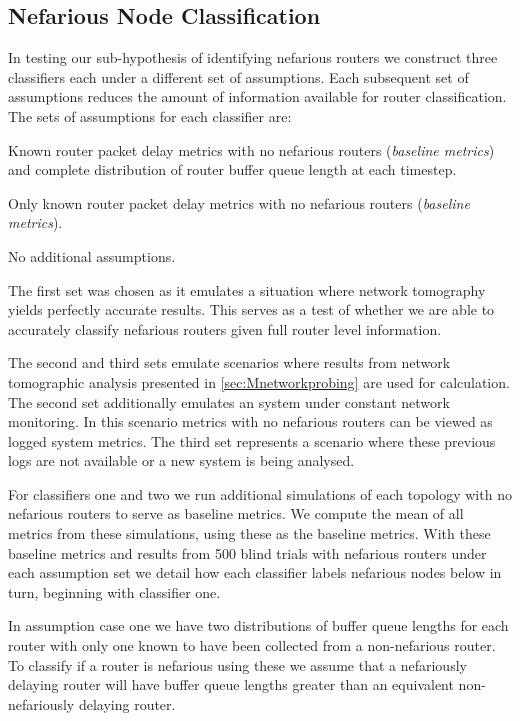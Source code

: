   \subsection{Nefarious Node Classification}
  \label{ssec:MTruevalues}
  In testing our sub-hypothesis of identifying nefarious routers we construct three classifiers each under a different set of assumptions. Each subsequent set of assumptions reduces the amount of information available for router classification. The sets of assumptions for each classifier are:
  \begin{description}[labelindent=1cm]
      \item[Classifier 1:] Known router packet delay metrics with no nefarious routers (\textit{baseline metrics}) and complete distribution of router buffer queue length at each timestep.
      \item[Classifier 2:] Only known router packet delay metrics with no nefarious routers (\textit{baseline metrics}).
      \item[Classifier 3:] No additional assumptions.
  \end{description}
The first set was chosen as it emulates a situation where network tomography yields perfectly accurate results. This serves as a test of whether we are able to accurately classify nefarious routers given full router level information.\par
The second and third sets emulate scenarios where results from network tomographic analysis presented in \cref{sec:Mnetworkprobing} are used for calculation. The second set additionally emulates an system under constant network monitoring. In this scenario metrics with no nefarious routers can be viewed as logged system metrics. The third set represents a scenario where these previous logs are not available or a new system is being analysed.\par
For classifiers one and two we run additional simulations of each topology with no nefarious routers to serve as baseline metrics. We compute the mean of all metrics from these simulations, using these as the baseline metrics. With these baseline metrics and results from 500 blind trials with nefarious routers under each assumption set we detail how each classifier labels nefarious nodes below in turn, beginning with classifier one.\par
In assumption case one we have two distributions of buffer queue lengths for each router with only one known to have been collected from a non-nefarious router. To classify if a router is nefarious using these we assume that a nefariously delaying router will have buffer queue lengths greater than an equivalent non-nefariously delaying router.\par
